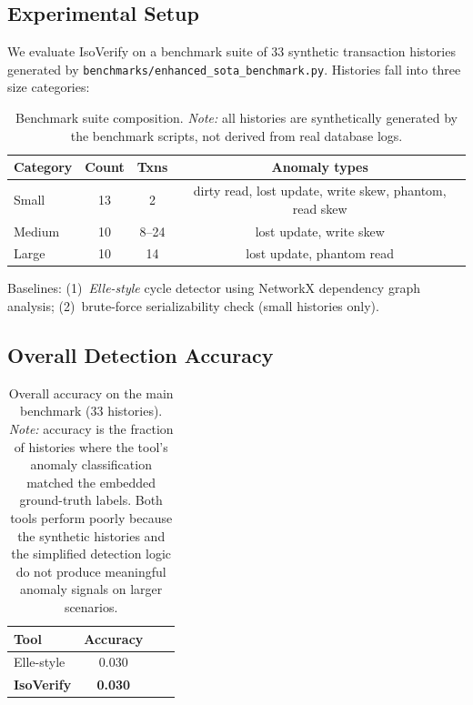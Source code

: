 \documentclass[11pt]{article}
\begin{document}
\subsection{Experimental Setup}

We evaluate IsoVerify on a benchmark suite of 33 synthetic transaction
histories generated by \texttt{benchmarks/enhanced\_sota\_benchmark.py}.
Histories fall into three size categories:

\begin{table}[t]
\centering
\caption{Benchmark suite composition.  \emph{Note:} all histories are
  synthetically generated by the benchmark scripts, not derived from
  real database logs.}
\label{tab:setup}
\begin{tabular}{lccc}
\toprule
\textbf{Category} & \textbf{Count} & \textbf{Txns} & \textbf{Anomaly types} \\
\midrule
Small   & 13 & 2        & dirty read, lost update, write skew, phantom, read skew \\
Medium  & 10 & 8--24    & lost update, write skew \\
Large   & 10 & 14       & lost update, phantom read \\
\bottomrule
\end{tabular}
\end{table}

Baselines: (1)~\emph{Elle-style} cycle detector using NetworkX dependency
graph analysis; (2)~brute-force serializability check (small histories only).

\subsection{Overall Detection Accuracy}

\begin{table}[t]
\centering
\caption{Overall accuracy on the main benchmark (33 histories).
  \emph{Note:} accuracy is the fraction of histories where the tool's
  anomaly classification matched the embedded ground-truth labels.
  Both tools perform poorly because the synthetic histories and the
  simplified detection logic do not produce meaningful anomaly signals
  on larger scenarios.}
\label{tab:overall}
\begin{tabular}{lccc}
\toprule
\textbf{Tool} & \textbf{Accuracy} \\
\midrule
Elle-style   & 0.030 \\
\textbf{IsoVerify} & \textbf{0.030} \\
\bottomrule
\end{tabular}
\end{table}
\end{document}

